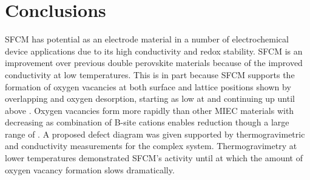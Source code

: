 \section{Conclusions}
    SFCM has potential as an electrode material in a number of electrochemical device applications due to its high conductivity and redox stability.
    SFCM is an improvement over previous double perovskite materials because of the improved conductivity at low temperatures.
    This is in part because SFCM supports the formation of oxygen vacancies at both surface and lattice positions shown by overlapping \textalpha{} and \textbeta{} oxygen desorption, starting as low at  and continuing up until above .
    Oxygen vacancies form more rapidly than other MIEC materials with decreasing  as combination of B-site cations enables reduction though a large range of .
    A proposed defect diagram was given supported by thermogravimetric and conductivity measurements for the complex system.
    Thermogravimetry at lower temperatures demonstrated SFCM's activity until  at which the amount of oxygen vacancy formation slows dramatically.
